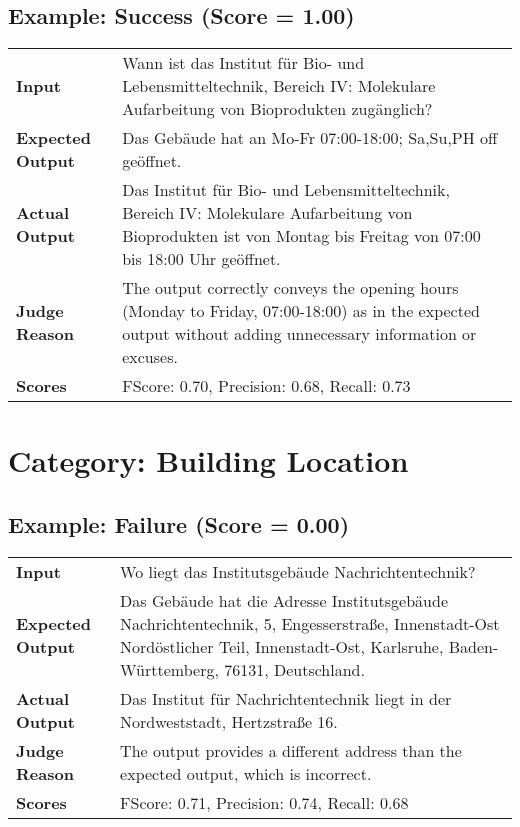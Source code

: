 \documentclass{article}
\begin{document}
\subsection*{Example: Success (Score = 1.00)}
\begin{longtable}{p{} p{}}
\textbf{Input} & Wann ist das Institut für Bio- und Lebensmitteltechnik, Bereich IV: Molekulare Aufarbeitung von Bioprodukten zugänglich? \\
\textbf{Expected Output} & Das Gebäude hat an Mo-Fr 07:00-18:00; Sa,Su,PH off geöffnet. \\
\textbf{Actual Output} & Das Institut für Bio- und Lebensmitteltechnik, Bereich IV: Molekulare Aufarbeitung von Bioprodukten ist von Montag bis Freitag von 07:00 bis 18:00 Uhr geöffnet. \\
\textbf{Judge Reason} & The output correctly conveys the opening hours (Monday to Friday, 07:00-18:00) as in the expected output without adding unnecessary information or excuses. \\
\textbf{Scores} & FScore: 0.70, Precision: 0.68, Recall: 0.73 \\
\end{longtable}
\section*{Category: Building Location}
\subsection*{Example: Failure (Score = 0.00)}
\begin{longtable}{p{} p{}}
\textbf{Input} & Wo liegt das Institutsgebäude Nachrichtentechnik? \\
\textbf{Expected Output} & Das Gebäude hat die Adresse Institutsgebäude Nachrichtentechnik, 5, Engesserstraße, Innenstadt-Ost Nordöstlicher Teil, Innenstadt-Ost, Karlsruhe, Baden-Württemberg, 76131, Deutschland. \\
\textbf{Actual Output} & Das Institut für Nachrichtentechnik liegt in der Nordweststadt, Hertzstraße 16. \\
\textbf{Judge Reason} & The output provides a different address than the expected output, which is incorrect. \\
\textbf{Scores} & FScore: 0.71, Precision: 0.74, Recall: 0.68 \\
\end{longtable}
\end{document}
